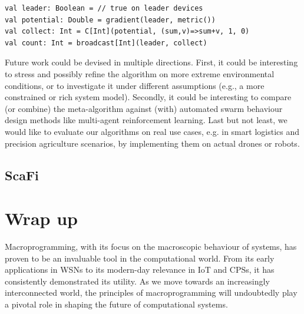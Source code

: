 \begin{lstlisting}
val leader: Boolean = // true on leader devices
val potential: Double = gradient(leader, metric())
val collect: Int = C[Int](potential, (sum,v)=>sum+v, 1, 0)
val count: Int = broadcast[Int](leader, collect)
\end{lstlisting}

Future work could be devised in multiple directions.
%
First, it could be interesting to stress and possibly refine
the algorithm on more extreme environmental conditions,
 or to investigate it under different assumptions (e.g., a more constrained or rich system model).
%
Secondly, it could be interesting to compare (or combine) the meta-algorithm against (with)
 automated swarm behaviour design methods
 like multi-agent reinforcement learning.
%
Last but not least, we would like to evaluate our algorithms on real use cases, e.g. in smart logistics and precision agriculture scenarios, by implementing them %
on actual drones or robots.
\subsection{ScaFi}

\section{Wrap up}

Macroprogramming, with its focus on the macroscopic behaviour of systems, 
 has proven to be an invaluable tool in the computational world. 
%
From its early applications in WSNs to its modern-day relevance in IoT and CPSs, 
 it has consistently demonstrated its utility. 
As we move towards an increasingly interconnected world, 
 the principles of macroprogramming will undoubtedly play a pivotal role in shaping the future of computational systems.


